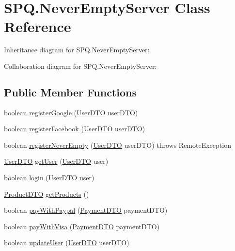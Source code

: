 \hypertarget{class_s_p_q_1_1_never_empty_server}{}\section{S\+P\+Q.\+Never\+Empty\+Server Class Reference}
\label{class_s_p_q_1_1_never_empty_server}


Inheritance diagram for S\+P\+Q.\+Never\+Empty\+Server\+:


Collaboration diagram for S\+P\+Q.\+Never\+Empty\+Server\+:
\subsection*{Public Member Functions}
\begin{DoxyCompactItemize}
\item 
boolean \mbox{\hyperlink{class_s_p_q_1_1_never_empty_server_ac97355451c02fc378cb5d8f33f442ce6}{register\+Google}} (\mbox{\hyperlink{class_s_p_q_1_1dto_1_1_user_d_t_o}{User\+D\+TO}} user\+D\+TO)
\item 
boolean \mbox{\hyperlink{class_s_p_q_1_1_never_empty_server_abf7e271e0edb91e8f8ed73063de74b03}{register\+Facebook}} (\mbox{\hyperlink{class_s_p_q_1_1dto_1_1_user_d_t_o}{User\+D\+TO}} user\+D\+TO)
\item 
boolean \mbox{\hyperlink{class_s_p_q_1_1_never_empty_server_ae52815c925e04018d6a1b2742d605063}{register\+Never\+Empty}} (\mbox{\hyperlink{class_s_p_q_1_1dto_1_1_user_d_t_o}{User\+D\+TO}} user\+D\+TO)  throws Remote\+Exception 
\item 
\mbox{\hyperlink{class_s_p_q_1_1dto_1_1_user_d_t_o}{User\+D\+TO}} \mbox{\hyperlink{class_s_p_q_1_1_never_empty_server_abb18bd0d72ecb8790068f206c592c58d}{get\+User}} (\mbox{\hyperlink{class_s_p_q_1_1dto_1_1_user_d_t_o}{User\+D\+TO}} user)
\item 
boolean \mbox{\hyperlink{class_s_p_q_1_1_never_empty_server_a79e3b01cc25be204f24e01c7fccbef13}{login}} (\mbox{\hyperlink{class_s_p_q_1_1dto_1_1_user_d_t_o}{User\+D\+TO}} user)
\item 
\mbox{\hyperlink{class_s_p_q_1_1dto_1_1_product_d_t_o}{Product\+D\+TO}} \mbox{\hyperlink{class_s_p_q_1_1_never_empty_server_ad8c5a0afa259c6b8bcc2eb2444742ca2}{get\+Products}} ()
\item 
boolean \mbox{\hyperlink{class_s_p_q_1_1_never_empty_server_a954ea8c563055eae79564b357e557f85}{pay\+With\+Paypal}} (\mbox{\hyperlink{class_s_p_q_1_1dto_1_1_payment_d_t_o}{Payment\+D\+TO}} payment\+D\+TO)
\item 
boolean \mbox{\hyperlink{class_s_p_q_1_1_never_empty_server_a455fa773e66917007842f9a92243ffa8}{pay\+With\+Visa}} (\mbox{\hyperlink{class_s_p_q_1_1dto_1_1_payment_d_t_o}{Payment\+D\+TO}} payment\+D\+TO)
\item 
boolean \mbox{\hyperlink{class_s_p_q_1_1_never_empty_server_ad39f95ea2309841407f7e8b9e1b9f664}{update\+User}} (\mbox{\hyperlink{class_s_p_q_1_1dto_1_1_user_d_t_o}{User\+D\+TO}} user\+D\+TO)
\end{DoxyCompactItemize}

